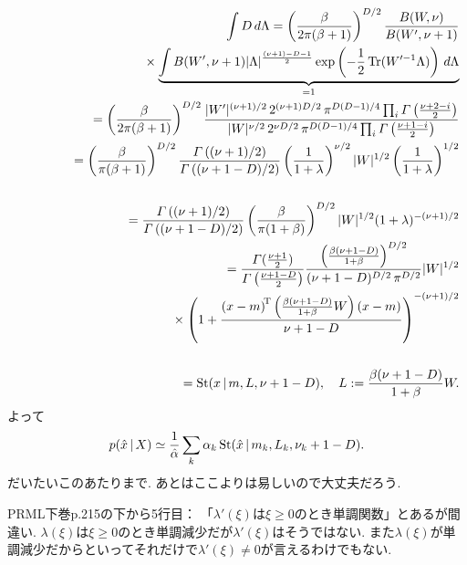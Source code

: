 \begin{eqnarray*}&&
 \int D\,d\Lambda
 = \left(\frac{\beta}{2\pi(\beta+1)}\right)^{D/2}\frac{B(W,\nu)}{B(W',\nu+1)}
\\&&\hphantom{\int D\,d\Lambda={}}\quad
     \times
     \underbrace{\int B(W',\nu+1)|\Lambda|^{\frac{(\nu+1)-D-1}{2}}\exp\left(-\half \tr (W'^{-1}\Lambda)\right)\,d\Lambda}_{=1}
\\&&\hphantom{\int D\,d\Lambda}
 = \left(\frac{\beta}{2\pi(\beta+1)}\right)^{D/2}
      \frac{|W'|^{(\nu+1)/2}\,2^{(\nu+1)D/2}\,\pi^{D(D-1)/4}\prod_i \fnGamma\left(\frac{\nu+2-i}{2}\right)}
           {|W|^{\nu/2}\,2^{\nu D/2}\,\pi^{D(D-1)/4} \prod_i \fnGamma\left(\frac{\nu+1-i}{2}\right)}
\\&&\hphantom{\int D\,d\Lambda}
 = \left(\frac{\beta}{\pi(\beta+1)}\right)^{D/2}\frac{\fnGamma\left((\nu+1)/2\right)}{\fnGamma\left((\nu+1-D)/2\right)}\left(\frac{1}{1+\lambda}\right)^{\nu/2}
      |W|^{1/2}\left(\frac{1}{1+\lambda}\right)^{1/2}\\
\\&&\hphantom{\int D\,d\Lambda}
 = \frac{\fnGamma\left((\nu+1)/2\right)}{\fnGamma\left((\nu+1-D)/2\right)} \left(\frac{\beta}{\pi(1+\beta)}\right)^{D/2}|W|^{1/2}(1+\lambda)^{-(\nu+1)/2}
\\&&\hphantom{\int D\,d\Lambda}
 = \frac{\fnGamma(\frac{\nu+1}{2})}{\fnGamma\left(\frac{\nu+1-D}{2}\right)} \frac{\left(\frac{\beta(\nu+1-D)}{1+\beta}\right)^{\sfrac{D}{2}}}
       {(\nu+1-D)^{\sfrac{D}{2}}\,\pi^{\sfrac{D}{2}}} |W|^{\sfrac{1}{2}}
\\&&\hphantom{\int D\,d\Lambda={}}\quad
     \times
     \left(1+\frac{\quads{\left(\frac{\beta(\nu+1-D)}{1+\beta}W\right)}{(x-m)}}{\nu+1-D}\right)^{\sfrac{-(\nu+1)}{2}}\\
\\&&\hphantom{\int D\,d\Lambda}
 = \St(x\,|\,m,L,\nu+1-D), \quad L:=\frac{\beta(\nu+1-D)}{1+\beta}W.
\end{eqnarray*}
よって
$$
p(\hat{x}\,|\,X) \simeq \frac{1}{\hat{\alpha}}\sum_k \alpha_k \mathop{\mathrm{St}}\nolimits(\hat{x}\,|\,m_k,L_k,\nu_k+1-D).
$$
だいたいこのあたりまで. あとはここよりは易しいので大丈夫だろう.

PRML下巻p.215の下から5行目：
「$\lambda'(\xi)$は$\xi \ge 0$のとき単調関数」とあるが間違い.
$\lambda(\xi)$は$\xi \ge 0$のとき単調減少だが$\lambda'(\xi)$はそうではない.
また$\lambda(\xi)$が単調減少だからといってそれだけで$\lambda'(\xi) \ne 0$が言えるわけでもない.

